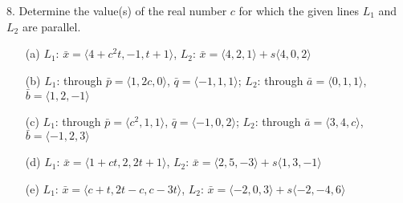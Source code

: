 \begin{exercisebox}
8. Determine the value(s) of the real number $c$ for which the given lines $L_1$ and $L_2$ are parallel.
\begin{itemize}
    \item[(a)] $L_1$: $\bar{x} = \langle 4 + c^2t, -1, t + 1 \rangle$, $L_2$: $\bar{x} = \langle 4, 2, 1 \rangle + s\langle 4, 0, 2 \rangle$
    \item[(b)] $L_1$: through $\bar{p} = \langle 1, 2c, 0 \rangle$, $\bar{q} = \langle -1, 1, 1 \rangle$; 
              $L_2$: through $\bar{a} = \langle 0, 1, 1 \rangle$, $\bar{b} = \langle 1, 2, -1 \rangle$
    \item[(c)] $L_1$: through $\bar{p} = \langle c^2, 1, 1 \rangle$, $\bar{q} = \langle -1, 0, 2 \rangle$; 
              $L_2$: through $\bar{a} = \langle 3, 4, c \rangle$, $\bar{b} = \langle -1, 2, 3 \rangle$
    \item[(d)] $L_1$: $\bar{x} = \langle 1 + ct, 2, 2t + 1 \rangle$, $L_2$: $\bar{x} = \langle 2, 5, -3 \rangle + s\langle 1, 3, -1 \rangle$
    \item[(e)] $L_1$: $\bar{x} = \langle c + t, 2t - c, c - 3t \rangle$, $L_2$: $\bar{x} = \langle -2, 0, 3 \rangle + s\langle -2, -4, 6 \rangle$
\end{itemize}
\end{exercisebox}
